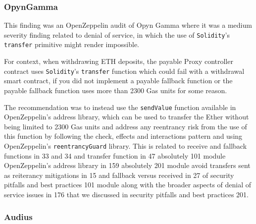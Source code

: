 \subsubsection{OpynGamma}\label{opyngamma}

This finding was an OpenZeppelin audit of Opyn Gamma where it was a
medium severity finding related to denial of service, in which the use
of \texttt{Solidity}'s \texttt{transfer} primitive might render
impossible.

For context, when withdrawing ETH deposits, the payable Proxy controller
contract uses \texttt{Solidity}'s \texttt{transfer} function which could
fail with a withdrawal smart contract, if you did not implement a
payable fallback function or the payable fallback function uses more
than 2300 Gas units for some reason.

The recommendation was to instead use the \texttt{sendValue} function
available in OpenZeppelin's address library, which can be used to
transfer the Ether without being limited to 2300 Gas units and address
any reentrancy risk from the use of this function by following the
check, effects and interactions pattern and using OpenZeppelin's
\texttt{reentrancyGuard} library. This is related to receive and
fallback functions in 33 and 34 and transfer function in 47 absolutely
101 module OpenZeppelin's address library in 159 absolutely 201 module
avoid transfers sent as reiterancy mitigations in 15 and fallback versus
received in 27 of security pitfalls and best practices 101 module along
with the broader aspects of denial of service issues in 176 that we
discussed in security pitfalls and best practices 201.

\subsubsection{Audius}\label{audius}

